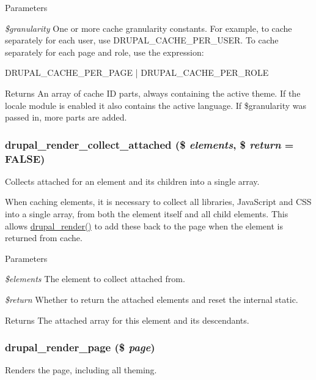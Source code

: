 \begin{DoxyParams}{Parameters}
\item[{\em \$granularity}]One or more cache granularity constants. For example, to cache separately for each user, use DRUPAL\_\-CACHE\_\-PER\_\-USER. To cache separately for each page and role, use the expression: 
\begin{DoxyCode}
   DRUPAL_CACHE_PER_PAGE | DRUPAL_CACHE_PER_ROLE
\end{DoxyCode}
\end{DoxyParams}
\begin{DoxyReturn}{Returns}
An array of cache ID parts, always containing the active theme. If the locale module is enabled it also contains the active language. If \$granularity was passed in, more parts are added. 
\end{DoxyReturn}
\hypertarget{common_8inc_a3a65448a9382c58f1767b8b01f27dae6}{
\subsubsection[{drupal\_\-render\_\-collect\_\-attached}]{\setlength{\rightskip}{0pt plus 5cm}drupal\_\-render\_\-collect\_\-attached (\$ {\em elements}, \/  \$ {\em return} = {\ttfamily FALSE})}}
\label{common_8inc_a3a65448a9382c58f1767b8b01f27dae6}
Collects attached for an element and its children into a single array.

When caching elements, it is necessary to collect all libraries, JavaScript and CSS into a single array, from both the element itself and all child elements. This allows \hyperlink{common_8inc_a05798b44e8d6c496d4bee5cc32fa7851}{drupal\_\-render()} to add these back to the page when the element is returned from cache.


\begin{DoxyParams}{Parameters}
\item[{\em \$elements}]The element to collect attached from. \item[{\em \$return}]Whether to return the attached elements and reset the internal static.\end{DoxyParams}
\begin{DoxyReturn}{Returns}
The attached array for this element and its descendants. 
\end{DoxyReturn}
\hypertarget{common_8inc_ad85d021b660f070849ed7c215d9758fe}{
\subsubsection[{drupal\_\-render\_\-page}]{\setlength{\rightskip}{0pt plus 5cm}drupal\_\-render\_\-page (\$ {\em page})}}
\label{common_8inc_ad85d021b660f070849ed7c215d9758fe}
Renders the page, including all theming.


